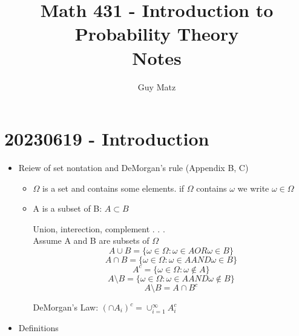 \documentclass{report}
\title{
  \Huge{Math 431 - Introduction to Probability Theory}
  \\
  Notes
}
\author{\huge{Guy Matz}}
\date{}
\begin{document}

\chapter{20230619 - Introduction}

\begin{itemize}
  \item Reiew of set nontation and DeMorgan's rule (Appendix B, C)

    \begin{itemize}

    \item $\Omega$ is a set and contains some elements.  if $\Omega$
      contains $\omega$ we write $\omega \in \Omega$

    \item A is a subset of B: $A \subset B$

    Union, interection, complement . . .\\
    Assume A and B are subsets of $\Omega$
    $$A \cup B = \{ \omega \in \Omega: \omega \in A OR \omega \in B\}$$
    $$A \cap B = \{ \omega \in \Omega: \omega \in A AND \omega \in B\}$$
    $$A^c = \{ \omega \in \Omega: \omega \notin A \}$$
    $$A \setminus B=\{\omega \in \Omega:\omega \in A AND \omega \notin B\}$$
    \[ A \setminus B = A \cap B^c \]

    DeMorgan's Law: $\left( \cap A_i \right)^c = \cup^{\infty}_{i=1} A_i^c$

    \end{itemize}

  \item Definitions





  \end{itemize}
\end{document}
